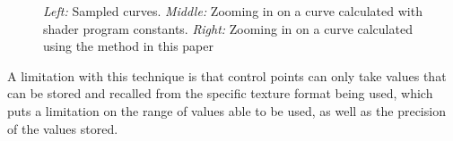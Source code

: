 \documentclass{jcgt}
\begin{document}
  \begin{figure}
    \caption{\textit{Left:} Sampled curves.  \textit{Middle:} Zooming in on a curve calculated with shader program constants.  \textit{Right:} Zooming in on a curve calculated using the method in this paper}   
    \label{fig:quickaccuracy}
  \end{figure}  

A limitation with this technique is that control points can only take values that can be stored and recalled from the specific texture format being used, which puts a limitation on the range of values able to be used, as well as the precision of the values stored.
\end{document}
